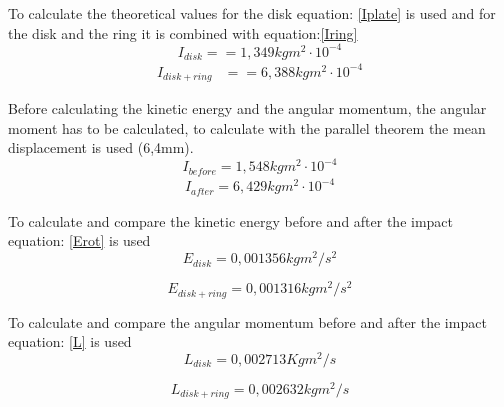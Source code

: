 \documentclass[11pt]{article}
\begin{document}
To calculate the theoretical values for the disk equation: \eqref{Iplate} is used and for the disk and the ring it is combined with equation:\eqref{Iring} 
\begin{equation}
I_{disk}=
=1,349kgm^2\cdot10^{-4}
\end{equation}
\begin{equation}
\begin{aligned}
I_{disk+ring} &=
=6,388kgm^2\cdot10^{-4}
\end{aligned}
\end{equation}

Before calculating the kinetic energy and the angular momentum, the angular moment has to be calculated, to calculate with the parallel theorem the mean displacement is used (6,4mm). 
\begin{equation}
I_{before}=
1,548kgm^2\cdot10^{-4}   
\end{equation}
\begin{equation}
    \begin{aligned}
I_{after}=
6,429kgm^2\cdot10^{-4}
    \end{aligned}
\end{equation}

To calculate and compare the kinetic energy before and after the impact equation: \eqref{Erot} is used 
\begin{equation}
E_{disk}=
0,001356kgm^2/s^2
\end{equation}

\begin{equation}
E_{disk+ring}=
0,001316kgm^2/s^2
\end{equation}

\newpage


To calculate and compare the angular momentum before and after the impact equation: \eqref{L} is used
\begin{equation}
L_{disk}=
0,002713Kgm^2/s
\end{equation}

\begin{equation}
L_{disk+ring}=
0,002632kgm^2/s
\end{equation}
\end{document}
